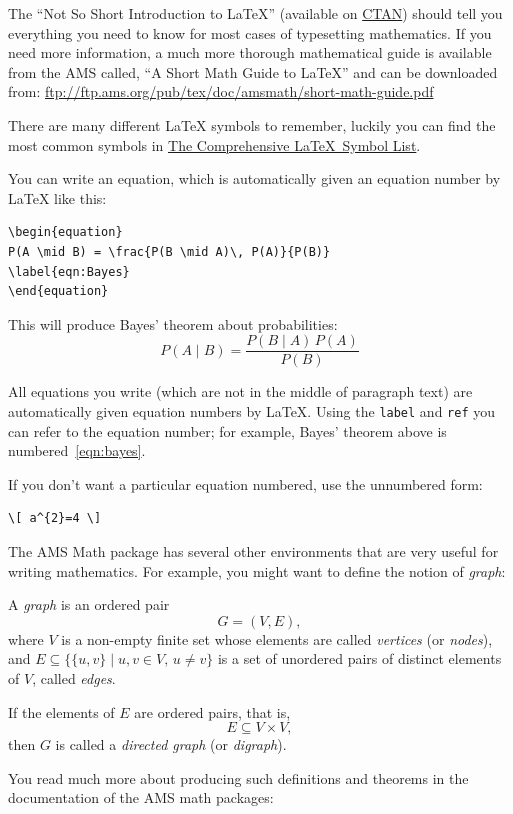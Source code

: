 The \enquote{Not So Short Introduction to \LaTeX} (available on
\href{http://www.ctan.org/tex-archive/info/lshort/english/lshort.pdf}{CTAN})
should tell you everything you need to know for most cases of
typesetting mathematics. If you need more information, a much more
thorough mathematical guide is available from the AMS called, \enquote{A
  Short Math Guide to \LaTeX} and can be downloaded from:
\url{ftp://ftp.ams.org/pub/tex/doc/amsmath/short-math-guide.pdf}

There are many different \LaTeX{} symbols to remember, luckily you can
find the most common symbols in
\href{http://ctan.org/pkg/comprehensive}{The Comprehensive \LaTeX~Symbol
  List}.

You can write an equation, which is automatically given an equation
number by \LaTeX{} like this:
\begin{verbatim}
\begin{equation}
P(A \mid B) = \frac{P(B \mid A)\, P(A)}{P(B)}
\label{eqn:Bayes}
\end{equation}
\end{verbatim}

This will produce Bayes' theorem about probabilities:
\begin{equation}
P(A \mid B) = \frac{P(B \mid A)\, P(A)}{P(B)}
\label{eqn:bayes}
\end{equation}

All equations you write (which are not in the middle of paragraph text)
are automatically given equation numbers by \LaTeX{}. Using the
\texttt{label} and \texttt{ref} you can refer to the equation number;
for example, Bayes' theorem above is numbered~\ref{eqn:bayes}.

If you don't want a particular equation numbered, use the unnumbered
form:
\begin{verbatim}
\[ a^{2}=4 \]
\end{verbatim}

The AMS Math package has several other environments that are very useful
for writing mathematics. For example, you might want to define the notion of \emph{graph}:

\begin{definition}[Graph]
  \label{def:graph}
A \emph{graph} is an ordered pair
\[
    G = (V, E),
\]
where \( V \) is a non-empty finite set whose elements are called
\emph{vertices} (or \emph{nodes}), and
\( E \subseteq \{ \{u, v\} \mid u, v \in V,\, u \neq v \} \) is a set of
unordered pairs of distinct elements of \( V \), called \emph{edges}.

If the elements of \( E \) are ordered pairs, that is,
\[
    E \subseteq V \times V,
\]
then \( G \) is called a \emph{directed graph} (or \emph{digraph}).
\end{definition}
%
You read much more about producing such definitions and theorems in the
documentation of the AMS math packages:

